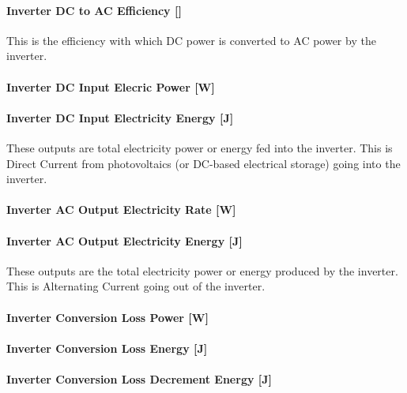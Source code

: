 \paragraph{Inverter DC to AC Efficiency {[]}}\label{inverter-dc-to-ac-efficiency}

This is the efficiency with which DC power is converted to AC power by the inverter.

\paragraph{Inverter DC Input Elecric Power {[}W{]}}\label{inverter-dc-input-elecric-power-w}

\paragraph{Inverter DC Input Electricity Energy {[}J{]}}\label{inverter-dc-input-electric-energy-j}

These outputs are total electricity power or energy fed into the inverter. This is Direct Current from photovoltaics (or DC-based electrical storage) going into the inverter.

\paragraph{Inverter AC Output Electricity Rate {[}W{]}}\label{inverter-ac-output-electric-power-w}

\paragraph{Inverter AC Output Electricity Energy {[}J{]}}\label{inverter-ac-output-electric-energy-j}

These outputs are the total electricity power or energy produced by the inverter. This is Alternating Current going out of the inverter.

\paragraph{Inverter Conversion Loss Power {[}W{]}}\label{inverter-conversion-loss-power-w}

\paragraph{Inverter Conversion Loss Energy {[}J{]}}\label{inverter-conversion-loss-energy-j}

\paragraph{Inverter Conversion Loss Decrement Energy {[}J{]}}\label{inverter-conversion-loss-decrement-energy-j}

